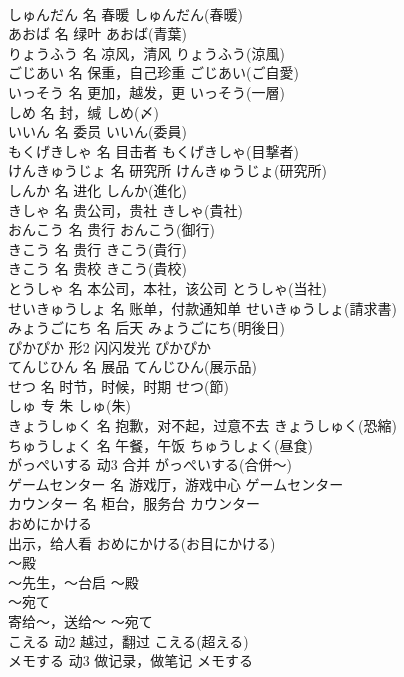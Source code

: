 \documentclass[8pt]{extreport}
\begin{document}
\begin{CJK}{UTF8}{min}
\\	しゅんだん	名	春暖	しゅんだん(春暖)	
\\	あおば	名	绿叶	あおば(青葉)	
\\	りょうふう	名	凉风，清风	りょうふう(涼風)	
\\	ごじあい	名	保重，自己珍重	ごじあい(ご自愛)	
\\	いっそう	名	更加，越发，更	いっそう(一層)	
\\	しめ	名	封，缄	しめ(〆)	
\\	いいん	名	委员	いいん(委員)	
\\	もくげきしゃ	名	目击者	もくげきしゃ(目撃者)	
\\	けんきゅうじょ	名	研究所	けんきゅうじょ(研究所)	
\\	しんか	名	进化	しんか(進化)	
\\	きしゃ	名	贵公司，贵社	きしゃ(貴社)	
\\	おんこう	名	贵行	おんこう(御行)	
\\	きこう	名	贵行	きこう(貴行)	
\\	きこう	名	贵校	きこう(貴校)	
\\	とうしゃ	名	本公司，本社，该公司	とうしゃ(当社)	
\\	せいきゅうしょ	名	账单，付款通知单	せいきゅうしょ(請求書)	
\\	みょうごにち	名	后天	みょうごにち(明後日)	
\\	ぴかぴか	形2	闪闪发光	ぴかぴか	
\\	てんじひん	名	展品	てんじひん(展示品)	
\\	せつ	名	时节，时候，时期	せつ(節)	
\\	しゅ	专	朱	しゅ(朱)	
\\	きょうしゅく	名	抱歉，对不起，过意不去	きょうしゅく(恐縮)	
\\	ちゅうしょく	名	午餐，午饭	ちゅうしょく(昼食)	
\\	がっぺいする	动3	合并	がっぺいする(合併～)	
\\	ゲームセンター	名	游戏厅，游戏中心	ゲームセンター	
\\	カウンター	名	柜台，服务台	カウンター	
\\	おめにかける	
\\	出示，给人看	おめにかける(お目にかける)	
\\	～殿	
\\	～先生，～台启	～殿	
\\	～宛て	
\\	寄给～，送给～	～宛て	
\\	こえる	动2	越过，翻过	こえる(超える)	
\\	メモする	动3	做记录，做笔记	メモする	

\end{CJK}
\end{document}
